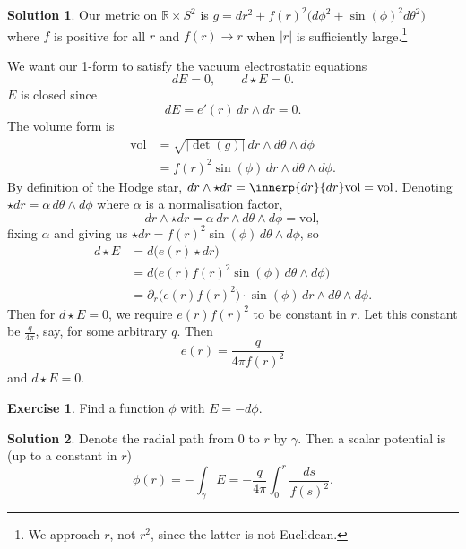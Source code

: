\documentclass[11pt, a4paper]{report}
\theoremstyle{definition}
\newtheorem{ex}{Exercise}[part]
\newtheorem{sol}{Solution}[part]
\begin{document}
\begin{sol}

Our metric on $\mathbb{R} \times S^2$ is $g = dr^2 + {f(r)}^2 \bigl( d\phi^2 + {\sin(\phi)}^2 d\theta^2 \bigr)$ where $f$ is positive for all $r$ and $f(r) \to r$ when $|r|$ is sufficiently large.\footnote{We approach $r$, not $r^2$, since the latter is not Euclidean.}

We want our 1-form to satisfy the vacuum electrostatic equations
\[
    dE = 0, \qquad
    d \star E = 0.
\]
$E$ is closed since
\[
    dE = e'(r) \, dr \wedge dr = 0.
\]
The volume form is
\begin{align*}
    \text{vol} &= \sqrt{|\det(g)|} \, dr \wedge d\theta \wedge d\phi \\
               &= {f(r)}^2 \sin(\phi) \, dr \wedge d\theta \wedge d\phi.
\end{align*}
By definition of the Hodge star, $dr \wedge \star dr = \innerp{dr}{dr} \text{vol} = \text{vol}$.
Denoting $\star dr = \alpha \, d\theta \wedge d\phi$ where $\alpha$ is a normalisation factor,
\[
    dr \wedge \star dr = \alpha \, dr \wedge d\theta \wedge d\phi = \text{vol},
\]
fixing $\alpha$ and giving us $\star dr = {f(r)}^2 \sin(\phi) \, d\theta \wedge d\phi$, so
\begin{align*}
    d \star E &= d \bigl( e(r) \star dr \bigr) \\
              &= d \bigl( e(r) {f(r)}^2 \sin(\phi) \, d\theta \wedge d\phi \bigr) \\
              &= \partial_r \bigl( e(r) {f(r)}^2 \bigr) \cdot \sin(\phi) \, dr \wedge d\theta \wedge d\phi.
\end{align*}
Then for $d \star E = 0$, we require $e(r) {f(r)}^2$ to be constant in $r$.
Let this constant be $\frac{q}{4 \pi}$, say, for some arbitrary $q$. Then
\[
    e(r) = \frac{q}{4 \pi {f(r)}^2}
\]
and $d \star E = 0$.

\end{sol}

\begin{ex}

Find a function $\phi$ with $E = -d\phi$.

\end{ex}

\begin{sol}

Denote the radial path from $0$ to $r$ by $\gamma$. Then a scalar potential is (up to a constant in $r$)
\[
    \phi(r) = -\int_\gamma E = -\frac{q}{4\pi}\int_0^r \frac{ds}{{f(s)}^2}.
\]

\end{sol}
\end{document}
